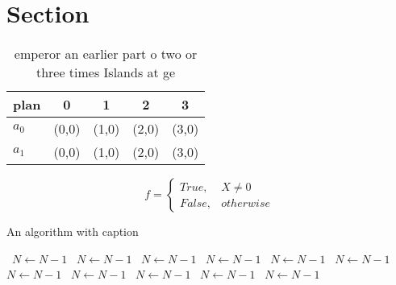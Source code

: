 \documentclass[a4paper]{article}
\begin{document}
\section{Section}

\begin{table}
\begin{adjustbox}{width=0.5\columnwidth}
\begin{tabular}{|l|l|l|l|l|}
\hline
\textbf{plan} & \multicolumn{1}{c|}{\textbf{0}} & \multicolumn{1}{c|}{\textbf{1}} & \multicolumn{1}{c|}{\textbf{2}} & \multicolumn{1}{c|}{\textbf{3}} \\ \hline
\textbf{$a_0$}  & (0,0) & (1,0) & (2,0) & (3,0) \\ \hline
\textbf{$a_1$}  & (0,0) & (1,0) & (2,0) & (3,0) \\ \hline
\end{tabular}
\end{adjustbox}
\caption{ emperor an earlier part o two or three times Islands at ge
}
\end{table}

\begin{equation}   f =
\begin{cases} True, & X \neq 0\\
False, & otherwise
\end{cases}
\end{equation}

\begin{algorithm}
\caption{An algorithm with caption}
\begin{algorithmic}
\    \State $N \gets N - 1$
\    \State $N \gets N - 1$
\    \State $N \gets N - 1$
\    \State $N \gets N - 1$
\    \State $N \gets N - 1$
\    \State $N \gets N - 1$
\    \State $N \gets N - 1$
\    \State $N \gets N - 1$
\    \State $N \gets N - 1$
\    \State $N \gets N - 1$
\    \State $N \gets N - 1$
\EndWhile
\end{algorithmic}
\end{algorithm}
\end{document}
